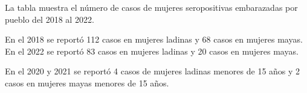La tabla muestra el número de casos de mujeres seropositivas embarazadas por pueblo del 2018 al 2022.  

En el 2018 se reportó 112 casos en mujeres ladinas y 68 casos en mujeres mayas. En el 2022 se reportó 83 casos en mujeres ladinas y 20 casos en mujeres mayas. 

En el 2020 y 2021 se reportó 4 casos de mujeres ladinas menores de 15 años y 2 casos en mujeres mayas menores de 15 años. 